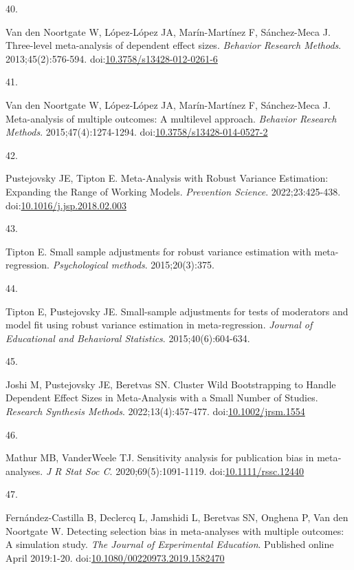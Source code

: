 \documentclass[
  american,
  man, donotrepeattitle,floatsintext]{apa7}
\newlength{\cslhangindent}
\newlength{\csllabelwidth}
\newenvironment{CSLReferences}[2] %
 {\begin{list}{}{%
  \setlength{\itemindent}{0pt}
  \setlength{\leftmargin}{0pt}
  \setlength{\parsep}{0pt}
  \ifodd #1
   \setlength{\leftmargin}{\cslhangindent}
   \setlength{\itemindent}{-1\cslhangindent}
  \fi
  \setlength{\itemsep}{#2\baselineskip}}}
 {\end{list}}
\newcommand{\CSLLeftMargin}[1]{\parbox[t]{\csllabelwidth}{\strut#1\strut}}
\newcommand{\CSLRightInline}[1]{\parbox[t]{\linewidth - \csllabelwidth}{\strut#1\strut}}
\begin{document}
\begin{CSLReferences}{0}{1}
\CSLLeftMargin{40. }%
\CSLRightInline{Van den Noortgate W, López-López JA, Marín-Martínez F, Sánchez-Meca J. Three-level meta-analysis of dependent effect sizes. \emph{Behavior Research Methods}. 2013;45(2):576-594. doi:\href{https://doi.org/10.3758/s13428-012-0261-6}{10.3758/s13428-012-0261-6}}

\CSLLeftMargin{41. }%
\CSLRightInline{Van den Noortgate W, López-López JA, Marín-Martínez F, Sánchez-Meca J. Meta-analysis of multiple outcomes: A multilevel approach. \emph{Behavior Research Methods}. 2015;47(4):1274-1294. doi:\href{https://doi.org/10.3758/s13428-014-0527-2}{10.3758/s13428-014-0527-2}}

\CSLLeftMargin{42. }%
\CSLRightInline{Pustejovsky JE, Tipton E. Meta-Analysis with Robust Variance Estimation: {Expanding} the Range of Working Models. \emph{Prevention Science}. 2022;23:425-438. doi:\href{https://doi.org/10.1016/j.jsp.2018.02.003}{10.1016/j.jsp.2018.02.003}}

\CSLLeftMargin{43. }%
\CSLRightInline{Tipton E. Small sample adjustments for robust variance estimation with meta-regression. \emph{Psychological methods}. 2015;20(3):375.}

\CSLLeftMargin{44. }%
\CSLRightInline{Tipton E, Pustejovsky JE. Small-sample adjustments for tests of moderators and model fit using robust variance estimation in meta-regression. \emph{Journal of Educational and Behavioral Statistics}. 2015;40(6):604-634.}

\CSLLeftMargin{45. }%
\CSLRightInline{Joshi M, Pustejovsky JE, Beretvas SN. Cluster Wild Bootstrapping to Handle Dependent Effect Sizes in Meta-Analysis with a Small Number of Studies. \emph{Research Synthesis Methods}. 2022;13(4):457-477. doi:\href{https://doi.org/10.1002/jrsm.1554}{10.1002/jrsm.1554}}

\CSLLeftMargin{46. }%
\CSLRightInline{Mathur MB, VanderWeele TJ. Sensitivity analysis for publication bias in meta‐analyses. \emph{J R Stat Soc C}. 2020;69(5):1091-1119. doi:\href{https://doi.org/10.1111/rssc.12440}{10.1111/rssc.12440}}

\CSLLeftMargin{47. }%
\CSLRightInline{Fernández-Castilla B, Declercq L, Jamshidi L, Beretvas SN, Onghena P, Van den Noortgate W. Detecting selection bias in meta-analyses with multiple outcomes: A simulation study. \emph{The Journal of Experimental Education}. Published online April 2019:1-20. doi:\href{https://doi.org/10.1080/00220973.2019.1582470}{10.1080/00220973.2019.1582470}}


\end{CSLReferences}
\end{document}
